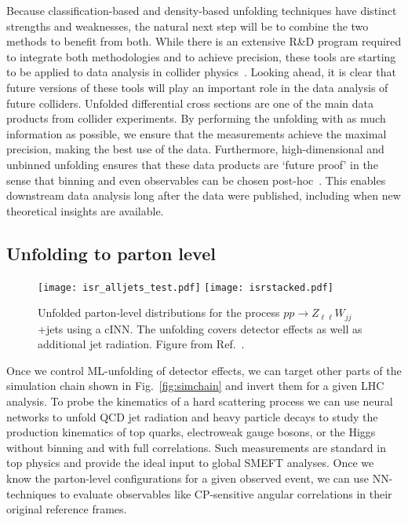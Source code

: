 \documentclass[submission,Phys]{SciPost}
\begin{document}
Because classification-based and density-based unfolding techniques have distinct strengths and weaknesses, the natural next step will be to combine the two methods to benefit from both.  While there is an extensive R\&D program required to integrate both methodologies and to achieve precision, these tools are starting to be applied to data analysis in collider physics~\cite{H1:2021wkz}.  Looking ahead, it is clear that future versions of these tools will play an important role in the data analysis of future colliders.  Unfolded differential cross sections are one of the main data products from collider experiments.  By performing the unfolding with as much information as possible, we ensure that the measurements achieve the maximal precision, making the best use of the data.  Furthermore, high-dimensional and unbinned unfolding ensures that these data products are `future proof' in the sense that binning and even observables can be chosen post-hoc~\cite{Arratia:2021otl}.  This enables downstream data analysis long after the data were published, including when new theoretical insights are available.

\subsection{Unfolding to parton level}
\label{sec:inverse_parton}

\begin{figure}[t]
  \texttt{[image: isr\_alljets\_test.pdf]}
  \texttt{[image: isrstacked.pdf]}
  \caption{Unfolded parton-level distributions for the process $pp \to Z_{\ell \ell} W_{jj}$+jets using a cINN. The unfolding covers detector effects as well as additional jet radiation. Figure from Ref.~\cite{Bellagente:2020piv}.}
  \label{fig:4_toparton}
\end{figure}

Once we control ML-unfolding of detector effects, we can target other parts of the simulation chain shown in Fig.~\ref{fig:simchain} and invert them for a given LHC analysis. To probe the kinematics of a hard scattering process we can use neural networks to unfold QCD jet radiation and heavy particle decays to study the production kinematics of top quarks, electroweak gauge bosons, or the Higgs without binning and with full correlations. Such measurements are standard in top physics and provide the ideal input to global SMEFT analyses. Once we know the parton-level configurations for a given observed event, we can use NN-techniques to evaluate observables like CP-sensitive angular correlations in their original reference frames.
\end{document}
